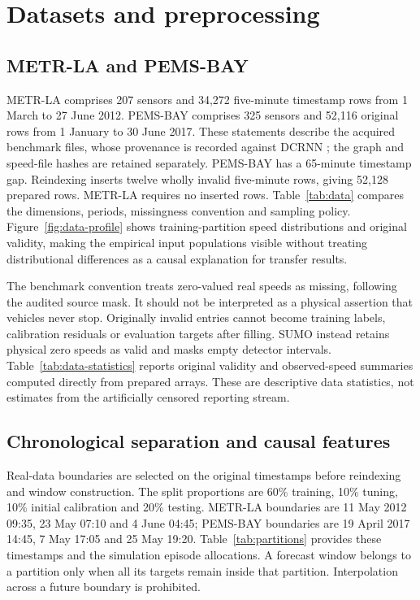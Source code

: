 \section{Datasets and preprocessing}\label{sec:data}
\subsection{METR-LA and PEMS-BAY}
METR-LA comprises 207 sensors and 34,272 five-minute timestamp rows from 1 March to 27 June 2012. PEMS-BAY comprises 325 sensors and 52,116 original rows from 1 January to 30 June 2017. These statements describe the acquired benchmark files, whose provenance is recorded against DCRNN \citep{li2018}; the graph and speed-file hashes are retained separately. PEMS-BAY has a 65-minute timestamp gap. Reindexing inserts twelve wholly invalid five-minute rows, giving 52,128 prepared rows. METR-LA requires no inserted rows. Table~\ref{tab:data} compares the dimensions, periods, missingness convention and sampling policy. Figure~\ref{fig:data-profile} shows training-partition speed distributions and original validity, making the empirical input populations visible without treating distributional differences as a causal explanation for transfer results.

The benchmark convention treats zero-valued real speeds as missing, following the audited source mask. It should not be interpreted as a physical assertion that vehicles never stop. Originally invalid entries cannot become training labels, calibration residuals or evaluation targets after filling. SUMO instead retains physical zero speeds as valid and masks empty detector intervals. Table~\ref{tab:data-statistics} reports original validity and observed-speed summaries computed directly from prepared arrays. These are descriptive data statistics, not estimates from the artificially censored reporting stream.

\subsection{Chronological separation and causal features}
Real-data boundaries are selected on the original timestamps before reindexing and window construction. The split proportions are 60\% training, 10\% tuning, 10\% initial calibration and 20\% testing. METR-LA boundaries are 11 May 2012 09:35, 23 May 07:10 and 4 June 04:45; PEMS-BAY boundaries are 19 April 2017 14:45, 7 May 17:05 and 25 May 19:20. Table~\ref{tab:partitions} provides these timestamps and the simulation episode allocations. A forecast window belongs to a partition only when all its targets remain inside that partition. Interpolation across a future boundary is prohibited.

